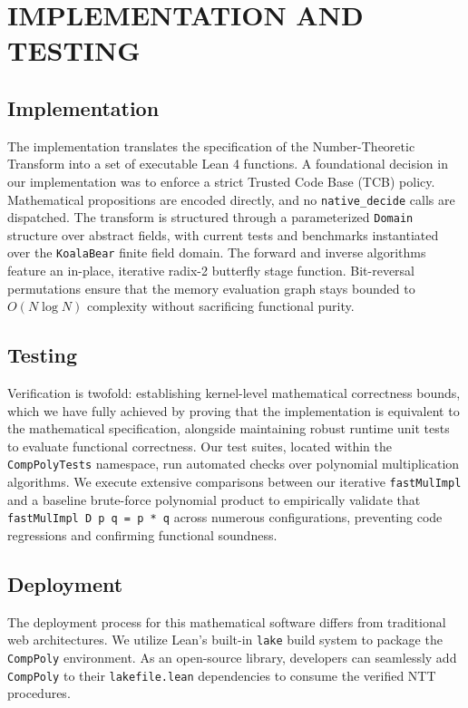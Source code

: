 \documentclass[a4paper,12pt]{report}
\begin{document}
\newpage

\chapter{IMPLEMENTATION AND TESTING}
\section{Implementation}
The implementation translates the specification of the Number-Theoretic Transform into a set of executable Lean 4 functions. A foundational decision in our implementation was to enforce a strict Trusted Code Base (TCB) policy. Mathematical propositions are encoded directly, and no \texttt{native\_decide} calls are dispatched. 
The transform is structured through a parameterized \texttt{Domain} structure over abstract fields, with current tests and benchmarks instantiated over the \texttt{KoalaBear} finite field domain. The forward and inverse algorithms feature an in-place, iterative radix-2 butterfly stage function. Bit-reversal permutations ensure that the memory evaluation graph stays bounded to $O(N \log N)$ complexity without sacrificing functional purity.

\section{Testing}
Verification is twofold: establishing kernel-level mathematical correctness bounds, which we have fully achieved by proving that the implementation is equivalent to the mathematical specification, alongside maintaining robust runtime unit tests to evaluate functional correctness. Our test suites, located within the \texttt{CompPolyTests} namespace, run automated checks over polynomial multiplication algorithms. We execute extensive comparisons between our iterative \texttt{fastMulImpl} and a baseline brute-force polynomial product to empirically validate that \texttt{fastMulImpl D p q = p * q} across numerous configurations, preventing code regressions and confirming functional soundness.

\section{Deployment}
The deployment process for this mathematical software differs from traditional web architectures. We utilize Lean's built-in \texttt{lake} build system to package the \texttt{CompPoly} environment. As an open-source library, developers can seamlessly add \texttt{CompPoly} to their \texttt{lakefile.lean} dependencies to consume the verified NTT procedures.
\newpage
\end{document}
